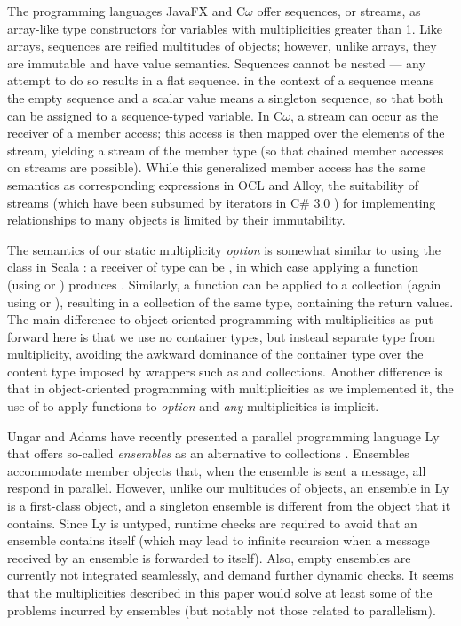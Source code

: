 {The programming languages JavaFX\texttrademark{} \cite{ref38} and C$\omega$ \cite{ref2} offer sequences,
or streams, as array-like type constructors for variables with multiplicities
greater than 1. Like arrays, sequences are reified multitudes of objects;
however, unlike arrays, they are immutable and have value semantics.
Sequences cannot be nested --- any attempt to do so results in a flat
sequence.  in the context of a sequence means the empty
sequence and a scalar value means a singleton sequence, so that both can be
assigned to a sequence-typed variable. In C$\omega$, a stream can occur as the
receiver of a member access; this access is then mapped over the elements of
the stream, yielding a stream of the member type (so that chained member
accesses on streams are possible). While this generalized member access has
the same semantics as corresponding expressions in OCL and Alloy, the
suitability of streams (which have been subsumed by iterators in C\# 3.0 \cite{ref4})
for implementing relationships to many objects is limited by their
immutability.

The semantics of our static multiplicity \emph{option} is somewhat
similar to using the  class in Scala \cite{ref29}: a receiver of type
 can be , in which case applying a function (using
 or ) produces . Similarly, a function
can be applied to a collection (again using  or ),
resulting in a collection of the same type, containing the return values.
The main difference to object-oriented programming with multiplicities as
put forward here is that we use no container types, but instead separate
type from multiplicity, avoiding the awkward dominance of the container type
over the content type \cite{ref37} imposed by wrappers such as  and
collections. Another difference is that in object-oriented programming with
multiplicities as we implemented it, the use of  to apply
functions to \emph{option} and \emph{any} multiplicities is implicit.

Ungar and Adams have recently presented a parallel programming language Ly
that offers so-called \emph{ensembles} as an alternative to collections
\cite{ref39}. Ensembles accommodate member objects that, when the ensemble is sent a
message, all respond in parallel. However, unlike our multitudes of objects,
an ensemble in Ly is a first-class object, and a singleton ensemble is
different from the object that it contains. Since Ly is untyped, runtime
checks are required to avoid that an ensemble contains itself (which may
lead to infinite recursion when a message received by an ensemble is
forwarded to itself). Also, empty ensembles are currently not integrated
seamlessly, and demand further dynamic checks. It seems that the
multiplicities described in this paper would solve at least some of the
problems incurred by ensembles (but notably not those related to
parallelism).

}
